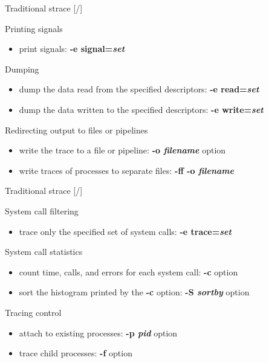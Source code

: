 \documentclass[unicode,aspectratio=169]{beamer}
\begin{document}
\begin{frame}{Traditional strace \hfill [\insertframenumber/\inserttotalframenumber]}
\large
\begin{block}{Printing signals}
\begin{itemize}
\item print signals: \textbf{-e signal=\textit{set}}
\end{itemize}
\end{block}

\begin{block}{Dumping}
\begin{itemize}
\item dump the data read from the specified descriptors: \textbf{-e read=\textit{set}}
\item dump the data written to the specified descriptors: \textbf{-e write=\textit{set}}
\end{itemize}
\end{block}

\begin{block}{Redirecting output to files or pipelines}
\begin{itemize}
\item write the trace to a file or pipeline: \textbf{-o \textit{filename}} option
\item write traces of processes to separate files: \textbf{-ff -o \textit{filename}}
\end{itemize}
\end{block}
\end{frame}

\begin{frame}{Traditional strace \hfill [\insertframenumber/\inserttotalframenumber]}
\large
\begin{block}{System call filtering}
\begin{itemize}
\item trace only the specified set of system calls: \textbf{-e trace=\textit{set}}
\end{itemize}
\end{block}

\begin{block}{System call statistics}
\begin{itemize}
\item count time, calls, and errors for each system call: \textbf{-c} option
\item sort the histogram printed by the \textbf{-c} option: \textbf{-S \textit{sortby}} option
\end{itemize}
\end{block}

\begin{block}{Tracing control}
\begin{itemize}
\item attach to existing processes: \textbf{-p \textit{pid}} option
\item trace child processes: \textbf{-f} option
\end{itemize}
\end{block}
\end{frame}
\end{document}
